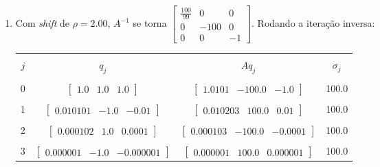 \documentclass[a4paper,11pt]{article}
\begin{document}
\begin{enumerate}[label=\textbf{(\alph*)}]
            \item Com \textit{shift} de $\rho=2.00$, $A^{-1}$ se torna $\begin{bmatrix}
                        \frac{100}{99} & 0 & 0 \\
                        0 & -100 & 0\\
                        0 & 0 & -1
                    \end{bmatrix}$. Rodando a iteração inversa:
            \begin{center}
                \begin{tabular}{ | c | c | c | c | } 
                    \hline
                    & & & \\ [-1em]
                    $j$ & $q_j$ & $Aq_j$ & $\sigma_j$\\  [+.5em]
                    \hline\hline
                    & & & \\ [-1em]
                    0  & $\begin{bmatrix} 1.0 & 1.0 & 1.0 \end{bmatrix}$ & $\begin{bmatrix} 1.0101 & -100.0 & -1.0 \end{bmatrix}$  & 100.0 \\ [+.5em]
                    \hline
                    & & & \\ [-1em]
                    1  & $\begin{bmatrix} 0.010101 & -1.0 & -0.01 \end{bmatrix}$ & $\begin{bmatrix} 0.010203 & 100.0 & 0.01 \end{bmatrix}$  & 100.0 \\ [+.5em]
                    \hline
                    & & & \\ [-1em]
                    2  & $\begin{bmatrix} 0.000102 & 1.0 & 0.0001 \end{bmatrix}$ & $\begin{bmatrix} 0.000103 & -100.0 & -0.0001 \end{bmatrix}$  & 100.0 \\ [+.5em]
                    \hline
                    & & & \\ [-1em]
                    3  & $\begin{bmatrix} 0.000001 & -1.0 & -0.000001 \end{bmatrix}$ & $\begin{bmatrix} 0.000001 & 100.0 & 0.000001 \end{bmatrix}$  & 100.0 \\ [+.5em]

\end{tabular}
\end{center}
\end{enumerate}
\end{document}
